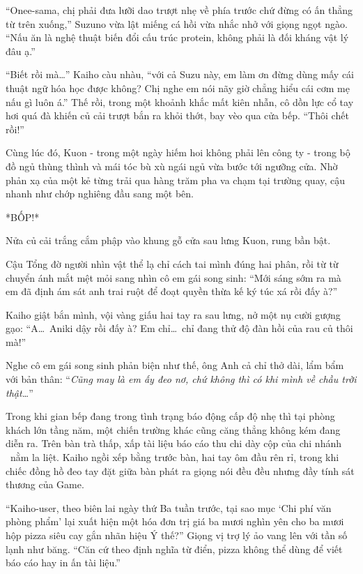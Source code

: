 ﻿\documentclass[../main.tex]{subfiles}
\begin{document}
``Onee-sama, chị phải đưa lưỡi dao trượt nhẹ về phía trước chứ đừng có ấn thẳng từ trên xuống,'' Suzuno vừa lật miếng cá hồi vừa nhắc nhở với giọng ngọt ngào. ``Nấu ăn là nghệ thuật biến đổi cấu trúc protein, không phải là đối kháng vật lý đâu ạ.''

``Biết rồi mà\dots'' Kaiho càu nhàu, ``với cả Suzu này, em làm ơn đừng dùng mấy cái thuật ngữ hóa học được không? Chị nghe em nói nãy giờ chẳng hiểu cái cơm mẹ nấu gì luôn á.'' Thế rồi, trong một khoảnh khắc mất kiên nhẫn, cô dồn lực cổ tay hơi quá đà khiến củ cải trượt bắn ra khỏi thớt, bay vèo qua cửa bếp. ``Thôi chết rồi!''

Cùng lúc đó, Kuon - trong một ngày hiếm hoi không phải lên công ty - trong bộ đồ ngủ thùng thình và mái tóc bù xù ngái ngủ vừa bước tới ngưỡng cửa. Nhờ phản xạ của một kẻ từng trải qua hàng trăm pha va chạm tại trường quay, cậu nhanh như chớp nghiêng đầu sang một bên.

*BỐP!*

Nửa củ cải trắng cắm phập vào khung gỗ cửa sau lưng Kuon, rung bần bật.

Cậu Tổng đờ người nhìn vật thể lạ chỉ cách tai mình đúng hai phân, rồi từ từ chuyển ánh mắt mệt mỏi sang nhìn cô em gái song sinh: ``Mới sáng sớm ra mà em đã định ám sát anh trai ruột để đoạt quyền thừa kế ký túc xá rồi đấy à?''

Kaiho giật bắn mình, vội vàng giấu hai tay ra sau lưng, nở một nụ cười gượng gạo: ``A\dots\ Aniki dậy rồi đấy à? Em chỉ\dots\ chỉ đang thử độ đàn hồi của rau củ thôi mà!''

Nghe cô em gái song sinh phản biện như thế, ông Anh cả chỉ thở dài, lẩm bẩm với bản thân: ``\textit{Cũng may là em ấy đeo nơ, chứ không thì có khi mình về chầu trời thật\dots}''

\ct

Trong khi gian bếp đang trong tình trạng báo động cấp độ nhẹ thì tại phòng khách lớn tầng năm, một chiến trường khác cũng căng thẳng không kém đang diễn ra. Trên bàn trà thấp, xấp tài liệu báo cáo thu chi dày cộp của chi nhánh \hls\ nằm la liệt. Kaiho ngồi xếp bằng trước bàn, hai tay ôm đầu rên rỉ, trong khi chiếc đồng hồ đeo tay đặt giữa bàn phát ra giọng nói đều đều nhưng đầy tính sát thương của Game.

``Kaiho-user, theo biên lai ngày thứ Ba tuần trước, tại sao mục `Chi phí văn phòng phẩm' lại xuất hiện một hóa đơn trị giá ba mươi nghìn yên cho ba mươi hộp pizza siêu cay gắn nhãn hiệu Ý thế?'' Giọng vị trợ lý ảo vang lên với tần số lạnh như băng. ``Căn cứ theo định nghĩa từ điển, pizza không thể dùng để viết báo cáo hay in ấn tài liệu.''
\end{document}
